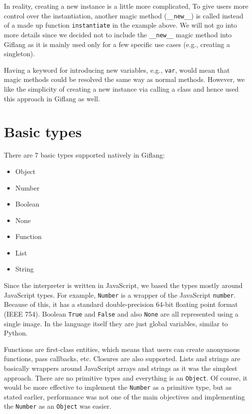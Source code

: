 In reality, creating a new instance is a little more complicated, To give users more control over the instantiation, another magic method (\texttt{\_\_new\_\_})
is called instead of a made up function \texttt{instantiate} in the example above. We will not go into more details since we decided not to include the
\texttt{\_\_new\_\_} magic method into Giflang as it is mainly used only for a few specific use cases (e.g., creating a singleton).

Having a keyword for introducing new variables, e.g., \texttt{var}, would mean that magic methods could be resolved the same way as normal methods. However,
we like the simplicity of creating a new instance via calling a class and hence used this approach in Giflang as well.

\section{Basic types}
There are 7 basic types supported natively in Giflang:
\begin{itemize}
    \item Object
    \item Number
    \item Boolean
    \item None
    \item Function
    \item List
    \item String
\end{itemize}

Since the interpreter is written in JavaScript, we based the types mostly around JavaScript types. For example, \texttt{Number} is a wrapper of the JavaScript
\texttt{number}. Because of this, it has a standard double-precision 64-bit floating point format (IEEE 754). Boolean \texttt{True} and \texttt{False}
and also \texttt{None} are all represented using a single image. In the language itself they are just global variables, similar to Python.

Functions are first-class entities, which means that users can create anonymous functions, pass callbacks, etc. Closures are also supported.
Lists and strings are basically wrappers around JavaScript arrays and strings as it was the simplest approach. There are no primitive types and everything is an
\texttt{Object}. Of course, it would be more effective to implement the \texttt{Number} as a primitive type, but as stated earlier, performance was not one of the main
objectives and implementing the \texttt{Number} as an \texttt{Object} was easier.

